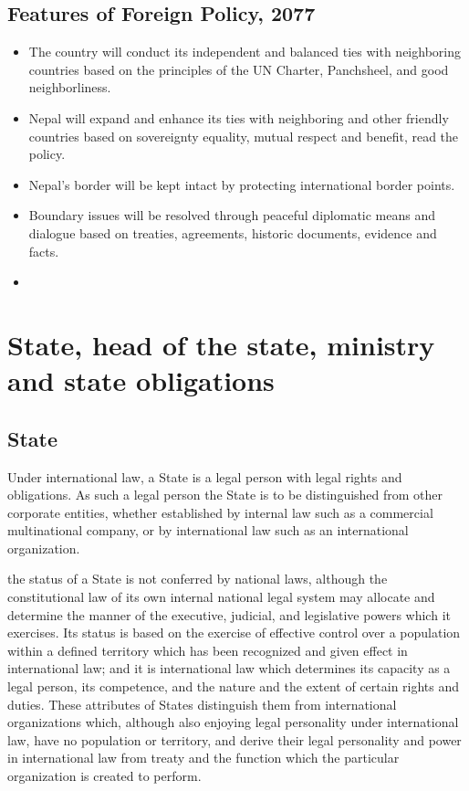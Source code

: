 \documentclass[
  openany]{book}
\providecommand{\tightlist}{%
  \setlength{\itemsep}{0pt}\setlength{\parskip}{0pt}}
\begin{document}
\hypertarget{features-of-foreign-policy-2077}{%
\section{Features of Foreign Policy, 2077}\label{features-of-foreign-policy-2077}}

\begin{itemize}
\tightlist
\item
  The country will conduct its independent and balanced ties with neighboring countries based on the principles of the UN Charter, Panchsheel, and good neighborliness.
\item
  Nepal will expand and enhance its ties with neighboring and other friendly countries based on sovereignty equality, mutual respect and benefit, read the policy.
\item
  Nepal's border will be kept intact by protecting international border points.
\item
  Boundary issues will be resolved through peaceful diplomatic means and dialogue based on treaties, agreements, historic documents, evidence and facts.
\item
\end{itemize}

\hypertarget{state-head-of-the-state-ministry-and-state-obligations}{%
\chapter{State, head of the state, ministry and state obligations}\label{state-head-of-the-state-ministry-and-state-obligations}}

\hypertarget{state}{%
\section{State}\label{state}}

Under international law, a State is a legal person with legal rights and obligations. As such a legal person the State is to be distinguished from other corporate entities, whether established by internal law such as a commercial multinational company, or by international law such as an international organization.

the status of a State is not conferred by national laws, although the constitutional law of its own internal national legal system may allocate and determine the manner of the executive, judicial, and legislative powers which it exercises. Its status is based on the exercise of effective control over a population within a defined territory which has been recognized and given effect in international law; and it is international law which determines its capacity as a legal person, its competence, and the nature and the extent of certain rights and duties. These attributes of States distinguish them from international organizations which, although also enjoying legal personality under international law, have no population or territory, and derive their legal personality and power in international law from treaty and the function which the particular organization is created to perform.
\end{document}
